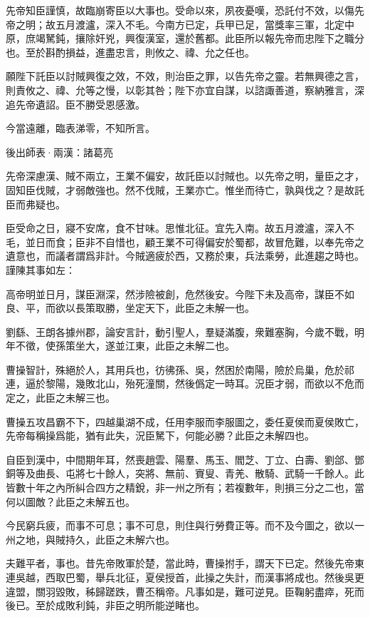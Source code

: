 \documentclass[12pt,a4paper]{ctexbook}
\begin{document}
先帝知臣謹慎，故臨崩寄臣以大事也。受命以來，夙夜憂嘆，恐託付不效，以傷先帝之明；故五月渡瀘，深入不毛。今南方已定，兵甲已足，當獎率三軍，北定中原，庶竭駑鈍，攘除奸兇，興復漢室，還於舊都。此臣所以報先帝而忠陛下之職分也。至於斟酌損益，進盡忠言，則攸之、禕、允之任也。\par
願陛下託臣以討賊興復之效，不效，則治臣之罪，以告先帝之靈。若無興德之言，則責攸之、禕、允等之慢，以彰其咎；陛下亦宜自謀，以諮諏善道，察納雅言，深追先帝遺詔。臣不勝受恩感激。\par
今當遠離，臨表涕零，不知所言。\par
後出師表·兩漢：諸葛亮 \par
先帝深慮漢、賊不兩立，王業不偏安，故託臣以討賊也。以先帝之明，量臣之才，固知臣伐賊，才弱敵強也。然不伐賊，王業亦亡。惟坐而待亡，孰與伐之？是故託臣而弗疑也。\par
臣受命之日，寢不安席，食不甘味。思惟北征。宜先入南。故五月渡瀘，深入不毛，並日而食；臣非不自惜也，顧王業不可得偏安於蜀都，故冒危難，以奉先帝之遺意也，而議者謂爲非計。今賊適疲於西，又務於東，兵法乘勞，此進趨之時也。謹陳其事如左：\par
高帝明並日月，謀臣淵深，然涉險被創，危然後安。今陛下未及高帝，謀臣不如良、平，而欲以長策取勝，坐定天下，此臣之未解一也。\par
劉繇、王朗各據州郡，論安言計，動引聖人，羣疑滿腹，衆難塞胸，今歲不戰，明年不徵，使孫策坐大，遂並江東，此臣之未解二也。\par
曹操智計，殊絕於人，其用兵也，彷彿孫、吳，然困於南陽，險於烏巢，危於祁連，逼於黎陽，幾敗北山，殆死潼關，然後僞定一時耳。況臣才弱，而欲以不危而定之，此臣之未解三也。\par
曹操五攻昌霸不下，四越巢湖不成，任用李服而李服圖之，委任夏侯而夏侯敗亡，先帝每稱操爲能，猶有此失，況臣駑下，何能必勝？此臣之未解四也。\par
自臣到漢中，中間期年耳，然喪趙雲、陽羣、馬玉、閻芝、丁立、白壽、劉郃、鄧銅等及曲長、屯將七十餘人，突將、無前、賨叟、青羌、散騎、武騎一千餘人。此皆數十年之內所糾合四方之精銳，非一州之所有；若複數年，則損三分之二也，當何以圖敵？此臣之未解五也。\par
今民窮兵疲，而事不可息；事不可息，則住與行勞費正等。而不及今圖之，欲以一州之地，與賊持久，此臣之未解六也。\par
夫難平者，事也。昔先帝敗軍於楚，當此時，曹操拊手，謂天下已定。然後先帝東連吳越，西取巴蜀，舉兵北征，夏侯授首，此操之失計，而漢事將成也。然後吳更違盟，關羽毀敗，秭歸蹉跌，曹丕稱帝。凡事如是，難可逆見。臣鞠躬盡瘁，死而後已。至於成敗利鈍，非臣之明所能逆睹也。\par
\end{document}
